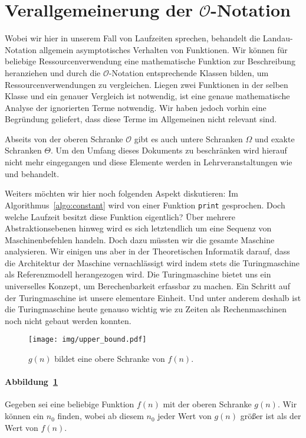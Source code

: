 \section{Verallgemeinerung der $\mathcal{O}$-Notation}
%
Wobei wir hier in unserem Fall von Laufzeiten sprechen, behandelt die Landau-Notation allgemein asymptotisches Verhalten von Funktionen. Wir können für beliebige Ressourcenverwendung eine mathematische Funktion zur Beschreibung heranziehen und durch die $\mathcal{O}$-Notation entsprechende Klassen bilden, um Ressourcenverwendungen zu vergleichen. Liegen zwei Funktionen in der selben Klasse und ein genauer Vergleich ist notwendig, ist eine genaue mathematische Analyse der ignorierten Terme notwendig. Wir haben jedoch vorhin eine Begründung geliefert, dass diese Terme im Allgemeinen nicht relevant sind.

Abseits von der oberen Schranke $\mathcal{O}$ gibt es auch untere Schranken $\Omega$ und exakte Schranken $\Theta$. Um den Umfang dieses Dokuments zu beschränken wird hierauf nicht mehr eingegangen und diese Elemente werden in Lehrveranstaltungen wie \coursedsa{} und \coursedaa{} behandelt.

Weiters möchten wir hier noch folgenden Aspekt diskutieren: Im Algorithmus~\ref{algo:constant} wird von einer Funktion \texttt{print} gesprochen. Doch welche Laufzeit besitzt diese Funktion eigentlich? Über mehrere Abstraktionsebenen hinweg wird es sich letztendlich um eine Sequenz von Maschinenbefehlen handeln. Doch dazu müssten wir die gesamte Maschine analysieren. Wir einigen uns aber in der Theoretischen Informatik darauf, dass die Architektur der Maschine vernachlässigt wird indem stets die Turingmaschine als Referenzmodell herangezogen wird. Die Turingmaschine bietet uns ein universelles Konzept, um Berechenbarkeit erfassbar zu machen. Ein Schritt auf der Turingmaschine ist unsere elementare Einheit. Und unter anderem deshalb ist die Turingmaschine heute genauso wichtig wie zu Zeiten als Rechenmaschinen noch nicht gebaut werden konnten.
%
\begin{figure}[h]
 \begin{center}
  \texttt{[image: img/upper\_bound.pdf]}
  \caption{$g(n)$ bildet eine obere Schranke von $f(n)$.}
  \label{fig:upper}
 \end{center}
\end{figure}

\paragraph{Abbildung~\ref{fig:upper}}
Gegeben sei eine beliebige Funktion $f(n)$ mit der oberen Schranke $g(n)$. Wir können ein $n_0$ finden, wobei ab diesem $n_0$ jeder Wert von $g(n)$ größer ist als der Wert von $f(n)$.
%
